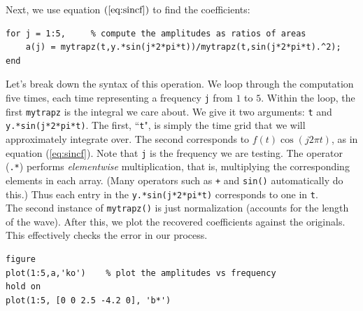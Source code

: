 \documentclass{article}
\begin{document}
Next, we use equation $(\ref{eq:sincf})$ to find the coefficients:
\begin{verbatim}
for j = 1:5,     % compute the amplitudes as ratios of areas
    a(j) = mytrapz(t,y.*sin(j*2*pi*t))/mytrapz(t,sin(j*2*pi*t).^2);
end
\end{verbatim}

Let's break down the syntax of this operation.  We loop through the computation five times, each time representing a frequency {\tt j} from $1$ to $5$.  Within the loop, the first {\tt mytrapz} is the integral we care about.  We give it two arguments: {\tt t} and {\tt y.*sin(j*2*pi*t)}.  The first, ``{\tt t}", is simply the time grid that we will approximately integrate over.  The second corresponds to $f(t)\cos(j 2\pi t)$, as in equation (\ref{eq:sincf}).  Note that {\tt j} is the frequency we are testing.  The operator ({\tt .*}) performs {\it elementwise} multiplication, that is, multiplying the corresponding elements in each array.  (Many operators such as {\tt +} and {\tt sin()} automatically do this.)  Thus each entry in the {\tt y.*sin(j*2*pi*t)} corresponds to one in {\tt t}.\\
   The second instance of {\tt mytrapz()} is just normalization (accounts for the length of the wave).  After this, we plot the recovered coefficients against the originals.  This effectively checks the error in our process.

\begin{verbatim}
figure
plot(1:5,a,'ko')    % plot the amplitudes vs frequency
hold on
plot(1:5, [0 0 2.5 -4.2 0], 'b*')
\end{verbatim}
\end{document}
